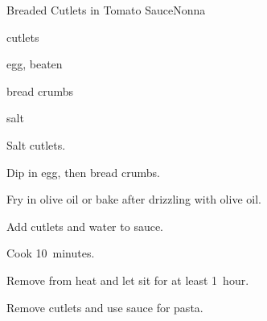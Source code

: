 \begin{recipe}{Breaded Cutlets in Tomato Sauce}{Nonna}{}

\begin{ingredients}
\item {} cutlets
\item egg, beaten
\item bread crumbs
\item salt
\item {}
\end{ingredients}

\begin{directions}
\item Salt cutlets.
\item Dip in egg, then bread crumbs.
\item Fry in olive oil or bake after drizzling with olive oil.
\item Add cutlets and  water to sauce.
\item Cook 10~minutes.
\item Remove from heat and let sit for at least 1~hour.
\item Remove cutlets and use sauce for pasta.
\end{directions}

\end{recipe}
